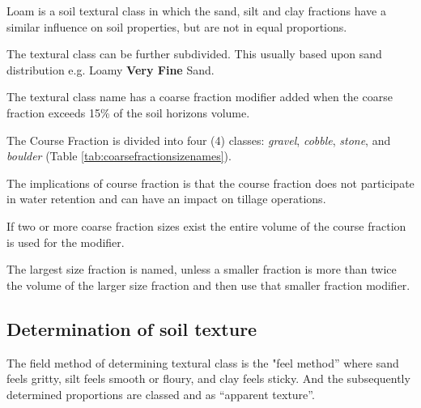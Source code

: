 \documentclass{book}
\begin{document}
Loam is a soil textural class in which the sand, silt and clay fractions have a similar influence on soil properties, but are not in equal proportions.
    
The textural class can be further subdivided. This usually based upon sand distribution e.g. Loamy \textbf{Very Fine} Sand.
    
The textural class name has a coarse fraction modifier added when the coarse fraction exceeds 15\% of the soil horizons volume.
    
The Course Fraction is divided into four (4) classes: \emph{gravel}, \emph{cobble}, \emph{stone}, and \emph{boulder} (Table \ref{tab:coarsefractionsizenames}).
    
The implications of course fraction is that the course fraction does not participate in water retention and can have an impact on tillage operations.
    
If two or more coarse fraction sizes exist the entire volume of the course fraction is used for the modifier.
    
The largest size fraction is named, unless a smaller fraction is more than twice the volume of the larger size fraction and then use that smaller fraction modifier.

    
\subsection{Determination of soil texture}

The field method of determining textural class is the "feel method” where sand feels gritty, silt feels smooth or floury, and clay feels sticky. And the subsequently determined proportions are classed and as “apparent texture”.
\end{document}
